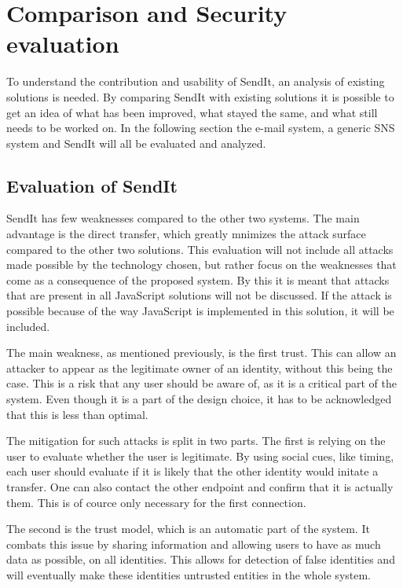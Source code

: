 %
\chapter{Comparison and Security evaluation} %
%
\label{Chapter6} %
%
To understand the contribution and usability of SendIt, an analysis of existing solutions is needed. By comparing SendIt with existing solutions it is possible to get an idea of what has been improved, what stayed the same, and what still needs to be worked on. In the following section the e-mail system, a generic SNS system and SendIt will all be evaluated and analyzed.
%
\section{Evaluation of SendIt}
%
	SendIt has few weaknesses compared to the other two systems. The main advantage is the direct transfer, which greatly mnimizes the attack surface compared to the other two solutions. This evaluation will not include all attacks made possible by the technology chosen, but rather focus on the weaknesses that come as a consequence of the proposed system. By this it is meant that attacks that are present in all JavaScript solutions will not be discussed. If the attack is possible because of the way JavaScript is implemented in this solution, it will be included.

	The main weakness, as mentioned previously, is the first trust. This can allow an attacker to appear as the legitimate owner of an identity, without this being the case. This is a risk that any user should be aware of, as it is a critical part of the system. Even though it is a part of the design choice, it has to be acknowledged that this is less than optimal.

	The mitigation for such attacks is split in two parts. The first is relying on the user to evaluate whether the user is legitimate. By using social cues, like timing, each user should evaluate if it is likely that the other identity would initate a transfer. One can also contact the other endpoint and confirm that it is actually them. This is of cource only necessary for the first connection.

	The second is the trust model, which is an automatic part of the system. It combats this issue by sharing information and allowing users to have as much data as possible, on all identities. This allows for detection of false identities and will eventually make these identities untrusted entities in the whole system.

